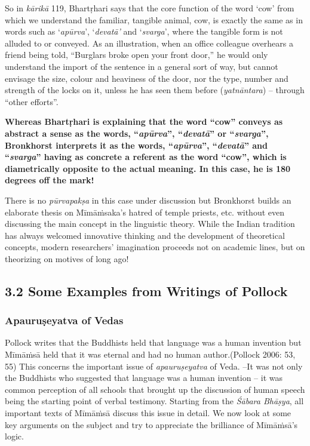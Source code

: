 So in \textit{kārikā} 119, Bhartṛhari says that the core function of the word ‘cow’ from which we understand the familiar, tangible animal, cow, is exactly the same as in words such as ‘\textit{apūrva}’, ‘\textit{devatā’} and ‘\textit{svarga}’, where the tangible form is not alluded to or conveyed. As an illustration, when an office colleague overhears a friend being told, “Burglars broke open your front door,” he would only understand the import of the sentence in a general sort of way, but cannot envisage the size, colour and heaviness of the door, nor the type, number and strength of the locks on it, unless he has seen them before (\textit{yatnāntara}) – through “other efforts”.

\textbf{Whereas Bhartṛhari is explaining that the word “cow” conveys as abstract a sense as the words, “\textit{apūrva}”, “\textit{devatā}” or “\textit{svarga}”, Bronkhorst interprets it as the words, “\textit{apūrva}”, “\textit{devatā}” and “\textit{svarga}” having as concrete a referent as the word “cow”, which is diametrically opposite to the actual meaning. In this case, he is 180 degrees off the mark!}

There is no \textit{pūrvapakṣa} in this case under discussion but Bronkhorst builds an elaborate thesis on Mīmāṁsaka’s hatred of temple priests, etc. without even discussing the main concept in the linguistic theory. While the Indian tradition has always welcomed innovative thinking and the development of theoretical concepts, modern researchers’ imagination proceeds not on academic lines, but on theorizing on motives of long ago!


\subsection*{3.2 Some Examples from Writings of Pollock}

\subsubsection*{Apauruṣeyatva of Vedas}

Pollock writes that the Buddhists held that language was a human invention but Mīmāṁsā held that it was eternal and had no human author.(Pollock 2006: 53, 55) This concerns the important issue of \textit{apauruṣeyatva} of Veda. –It was not only the Buddhists who suggested that language was a human invention – it was common perception of all schools that brought up the discussion of human speech being the starting point of verbal testimony. Starting from the \textit{Śābara Bhāṣya}, all important texts of Mīmāṁsā discuss this issue in detail. We now look at some key arguments on the subject and try to appreciate the brilliance of Mīmāṁsā’s logic.

